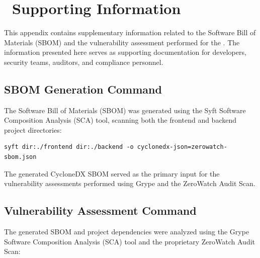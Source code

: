 
\chapter[Supporting Information]{\IconTerminal\ Supporting Information}

This appendix contains supplementary information related to the Software Bill of Materials (SBOM) and the vulnerability assessment performed for the \textbf{\ProjectName}. The information presented here serves as supporting documentation for developers, security teams, auditors, and compliance personnel.

\vspace{0.4cm}


\section{SBOM Generation Command}

The Software Bill of Materials (SBOM) was generated using the Syft Software Composition Analysis (SCA) tool, scanning both the frontend and backend project directories:

\begin{verbatim}
syft dir:./frontend dir:./backend -o cyclonedx-json=zerowatch-sbom.json
\end{verbatim}

The generated CycloneDX SBOM served as the primary input for the vulnerability assessments performed using Grype and the ZeroWatch Audit Scan.

\vspace{0.4cm}


\section{Vulnerability Assessment Command}

The generated SBOM and project dependencies were analyzed using the Grype Software Composition Analysis (SCA) tool and the proprietary ZeroWatch Audit Scan:

